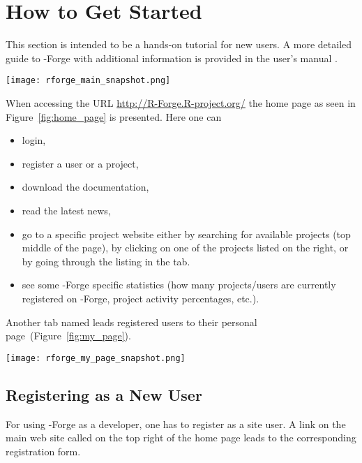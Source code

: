 \section{How to Get Started}
This section is intended to be a hands-on tutorial for new users. A
more detailed guide to \R{}-Forge with additional 
information is provided in the user's manual
\citep{forge:usermanual:2008}.

\begin{figure*}[th]
\centering
\texttt{[image: rforge\_main\_snapshot.png]}
\caption{Home page of \R{}-Forge}
\label{fig:home_page}
\end{figure*}

When accessing the URL \url{http://R-Forge.R-project.org/} the home
page as seen in Figure~\ref{fig:home_page} is presented. Here one can

\begin{itemize}
\item login,
\item register a user or a project,
\item download the documentation,
\item read the latest news,
\item go to a specific project website either by searching for available
  projects (top middle of the page), by clicking on one of the projects
  listed on the right, or by going through the listing in
  the  tab.
\item see some \R{}-Forge specific statistics (how many projects/users
  are currently registered on \R{}-Forge, project activity percentages,
  etc.).
\end{itemize}

Another tab named  leads registered users
to their personal page~(Figure~\ref{fig:my_page}).

\begin{figure*}[th]
\centering
\texttt{[image: rforge\_my\_page\_snapshot.png]}
\caption{A  tab of a registered user}
\label{fig:my_page}
\end{figure*}

\subsection{Registering as a New User}

For using \R{}-Forge as a developer, one has
to register as a site user. A link on the main web site called
 on the top right of the home page leads to the
corresponding registration form.

